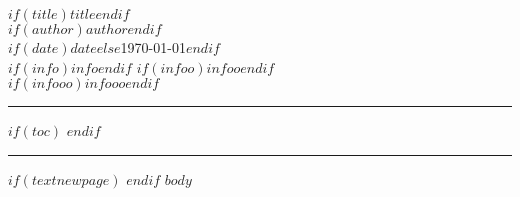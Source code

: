 \documentclass[$if(fontsize)$$fontsize$$endif$, a4paper]{article}
\begin{document}
\begin{center}
    $if(title)$\Large{\textbf{$title$}}$endif$\\
\vspace{0.4cm}
\normalsize
    $if(author)$\underline{\textbf{$author$}}$endif$ \\
\vspace{0.1cm}
$if(date)$$date$$else$\today$endif$\\
\medskip
$if(info)$\small{$info$}$endif$ \hspace*{3cm} $if(infoo)$\small{$infoo$}$endif$\\
\medskip\vspace{0,5cm}
$if(infooo)$\small{$infooo$}$endif$\\



    \medskip
    \normalsize
\end{center}
\medskip

{\color{gray}\hrule}
$if(toc)$ \tableofcontents $endif$
\medskip

{\color{gray}\hrule}
\bigskip
$if(textnewpage)$\thispagestyle{empty}
\newpage\setcounter{page}{1}
$endif$
$body$



\end{document}
